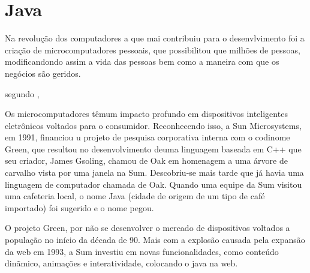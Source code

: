 










\section{Java}

\par  Na revolução dos computadores a que mai contribuiu para o desenvlvimento
foi a criação de microcomputadores pessoais, que possibilitou que milhões de
pessoas, modificandondo assim a vida das pessoas bem como a maneira com que os
negócios são geridos.

\par segundo ,

\begin{citacao}
	Os microcomputadores têmum impacto profundo em dispositivos inteligentes
	eletrônicos voltados para o consumidor. Reconhecendo isso, a Sun Microsystems,
	em 1991, financiou u projeto de pesquisa corporativa interna com o codinome
	Green, que resultou no desenvolvimento deuma linguagem baseada em C++ que seu
	criador, James Gsoling, chamou de Oak em homenagem a uma árvore de carvalho
	vista por uma janela na Sum. Descobriu-se mais tarde que já havia uma linguagem
	de computador chamada de Oak. Quando uma equipe da Sum visitou uma cafeteria
	local, o nome Java (cidade de origem de um tipo de café importado) foi sugerido
	e o nome pegou.
\end{citacao}

\par O projeto Green, por não se desenvolver o mercado de dispositivos voltados
a população no início da década de 90. Mais com a explosão causada pela expansão
da web em 1993, a Sum investiu em novas funcionalidades, como conteúdo dinãmico,
animações e interatividade, colocando o java na web.

